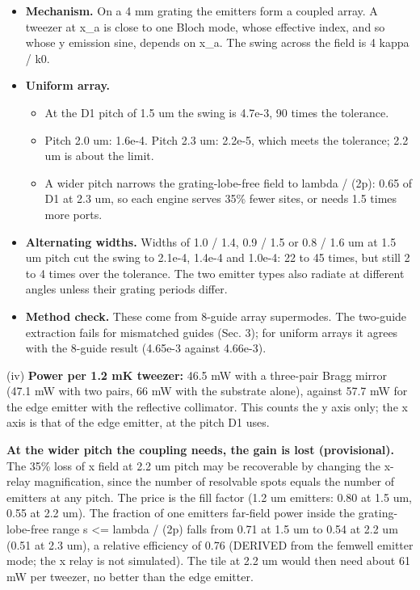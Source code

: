 \begin{itemize}
\tightlist
\item
  \textbf{Mechanism.} On a 4 mm grating the emitters form a coupled
  array. A tweezer at x\_a is close to one Bloch mode, whose effective
  index, and so whose y emission sine, depends on x\_a. The swing across
  the field is 4 kappa / k0.
\item
  \textbf{Uniform array.}

  \begin{itemize}
  \tightlist
  \item
    At the D1 pitch of 1.5 um the swing is 4.7e-3, 90 times the
    tolerance.
  \item
    Pitch 2.0 um: 1.6e-4. Pitch 2.3 um: 2.2e-5, which meets the
    tolerance; 2.2 um is about the limit.
  \item
    A wider pitch narrows the grating-lobe-free field to lambda / (2p):
    0.65 of D1 at 2.3 um, so each engine serves 35\% fewer sites, or
    needs 1.5 times more ports.
  \end{itemize}
\item
  \textbf{Alternating widths.} Widths of 1.0 / 1.4, 0.9 / 1.5 or 0.8 /
  1.6 um at 1.5 um pitch cut the swing to 2.1e-4, 1.4e-4 and 1.0e-4: 22
  to 45 times, but still 2 to 4 times over the tolerance. The two
  emitter types also radiate at different angles unless their grating
  periods differ.
\item
  \textbf{Method check.} These come from 8-guide array supermodes. The
  two-guide extraction fails for mismatched guides (Sec. 3); for uniform
  arrays it agrees with the 8-guide result (4.65e-3 against 4.66e-3).
\end{itemize}

(iv) \textbf{Power per 1.2 mK tweezer:} 46.5 mW with a three-pair Bragg
mirror (47.1 mW with two pairs, 66 mW with the substrate alone), against
57.7 mW for the edge emitter with the reflective collimator. This counts
the y axis only; the x axis is that of the edge emitter, at the pitch D1
uses.

\textbf{At the wider pitch the coupling needs, the gain is lost
(provisional).} The 35\% loss of x field at 2.2 um pitch may be
recoverable by changing the x-relay magnification, since the number of
resolvable spots equals the number of emitters at any pitch. The price
is the fill factor (1.2 um emitters: 0.80 at 1.5 um, 0.55 at 2.2 um).
The fraction of one emitter\textquotesingle s far-field power inside the
grating-lobe-free range \textbar s\textbar{} \textless= lambda / (2p)
falls from 0.71 at 1.5 um to 0.54 at 2.2 um (0.51 at 2.3 um), a relative
efficiency of 0.76 (DERIVED from the femwell emitter mode; the x relay
is not simulated). The tile at 2.2 um would then need about 61 mW per
tweezer, no better than the edge emitter.

